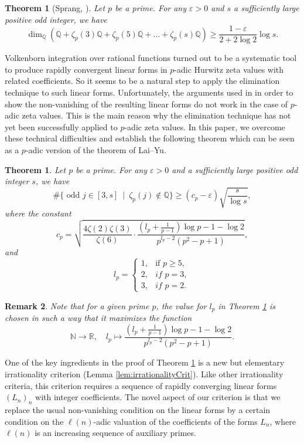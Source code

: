 \documentclass[12pt]{article}
\newtheorem{theorem}{Theorem}[section]
\newtheorem*{theorem*}{Theorem}
\newtheorem{remark}[theorem]{Remark}
\numberwithin{equation}{section}
\begin{document}
\begin{theorem*}[Sprang, \cite{Spr2020}]
Let $p$ be a prime. For any $\varepsilon>0$ and $s$ a sufficiently large positive odd integer, we have
\[
		\dim_{\mathbb{Q}} \left( \mathbb{Q}+ \zeta_p(3)\mathbb{Q}+ \zeta_p(5)\mathbb{Q}+\dots + \zeta_p(s)\mathbb{Q} \right)\geqslant \frac{1-\varepsilon}{2+2\log 2} \log s.
	\]
\end{theorem*}  
Volkenborn integration over rational functions turned out to be a systematic tool to produce rapidly convergent linear forms in $p$-adic Hurwitz zeta values with related coefficients. So it seems to be a natural step to apply the elimination technique to such linear forms. Unfortunately, the arguments used in \cite{FSZ2019,LY2020} in order to show the non-vanishing of the resulting linear forms do not work in the case of $p$-adic zeta values. This is the main reason why the elimination technique has not yet been successfully applied to $p$-adic zeta values. In this paper, we overcome these technical difficulties and establish the following theorem which can be seen as a $p$-adic version of the theorem of Lai--Yu. 
\begin{theorem}\label{thmA}
    Let $p$ be a prime. For any $\varepsilon > 0$ and a sufficiently large positive odd integer $s$, we have
	\[ \#\{ \text{~odd~} j \in [3,s] ~\mid~ \zeta_p(j) \notin \mathbb{Q} \} \geqslant (c_p - \varepsilon)\sqrt{\frac{s}{\log s}},\]
	where the constant
	\[c_p = \sqrt{\frac{4\zeta(2)\zeta(3)}{\zeta(6)}\cdot\frac{\left(l_p+\frac{1}{p-1}\right)\log p - 1 - \log 2}{p^{l_p-2}(p^2-p+1)}},  \]
	and 
	\[ l_p = \begin{cases}
		1, &\text{if~} p \geqslant 5, \\
		2, &\textit{if~} p=3, \\
		3, &\textit{if~} p=2.
	\end{cases} \]
\end{theorem} 

\begin{remark}
Note that for a given prime $p$, the value for $l_p$ in Theorem \ref{thmA} is chosen in such a way that it maximizes the function
\[
 \mathbb{N}\to \mathbb{R}, \quad l_p\mapsto \frac{\left(l_p+\frac{1}{p-1}\right)\log p - 1 - \log 2}{p^{l_p-2}(p^2-p+1)}.
\]
\end{remark}


One of the key ingredients in the proof of Theorem \ref{thmA} is a new but elementary irrationality criterion (Lemma \ref{lem:irrationalityCrit}). Like other irrationality criteria, this criterion requires a sequence of rapidly converging linear forms $(L_n)_n$ with integer coefficients. The novel aspect of our criterion is that we replace the usual non-vanishing condition on the linear forms by a certain condition on the $\ell(n)$-adic valuation of the coefficients of the forms $L_n$, where $\ell(n)$ is an increasing sequence of auxiliary primes.
\end{document}
